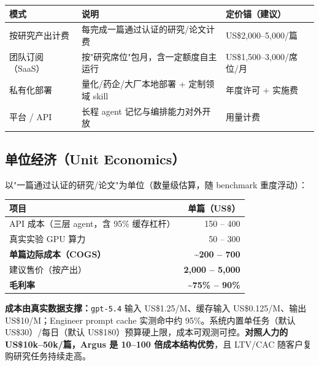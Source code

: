 \documentclass[UTF8,11pt,fontset=none]{ctexart}
\newcommand{\thd}[1]{\textbf{\color{white}#1}}
\newcommand{\headrow}{\rowcolor{argusnavy}}
\newcommand{\altrow}{\rowcolor{arguslight}}
\begin{document}
\begin{tabularx}{\textwidth}{@{}>{\raggedright\arraybackslash}p{3.4cm} X >{\raggedright\arraybackslash}p{3.3cm}@{}}
\toprule
\headrow \thd{模式} & \thd{说明} & \thd{定价锚（建议）} \\
\midrule
\altrow 按研究产出计费 & 每完成一篇通过认证的研究/论文计费 & US\$2,000–5,000/篇 \\
团队订阅（SaaS） & 按"研究席位"包月，含一定额度自主运行 & US\$1,500–3,000/席位/月 \\
\altrow 私有化部署 & 量化/药企/大厂本地部署 + 定制领域 skill & 年度许可 + 实施费 \\
平台 / API & 长程 agent 记忆与编排能力对外开放 & 用量计费 \\
\bottomrule
\end{tabularx}

\subsection{单位经济（Unit Economics）}

以"一篇通过认证的研究/论文"为单位（数量级估算，随 benchmark 重度浮动）：

\begin{tabularx}{\textwidth}{@{}X r@{}}
\toprule
\headrow \thd{项目} & \thd{单篇（US\$）} \\
\midrule
\altrow API 成本（三层 agent，含 95\% 缓存杠杆） & 150 – 400 \\
真实实验 GPU 算力 & 50 – 300 \\
\altrow \textbf{单篇边际成本（COGS）} & \textbf{\textasciitilde 200 – 700} \\
建议售价（按产出） & \textbf{2,000 – 5,000} \\
\altrow \textbf{毛利率} & \textbf{\textasciitilde 75\% – 90\%} \\
\bottomrule
\end{tabularx}

\begin{keybox}
\textbf{成本由真实数据支撑：}\texttt{gpt-5.4} 输入 US\$1.25/M、缓存输入 US\$0.125/M、输出 US\$10/M；Engineer prompt cache 实测命中约 95\%。系统内置单任务（默认 US\$30）/每日（默认 US\$180）预算硬上限，成本可观测可控。\textbf{对照人力的 US\$10k–50k/篇，Argus 是 10–100 倍成本结构优势}，且 LTV/CAC 随客户复购研究任务持续走高。
\end{keybox}

\end{document}
